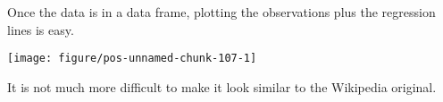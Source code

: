 \documentclass[paper=a4,10pt,div=17,headsepline,BCOR=12mm,twoside,open=right]{scrbook}\usepackage{knitr}
\begin{document}
\begin{knitrout}\footnotesize
{}\color{fgcolor}\begin{kframe}
\begin{alltt}
 \hlkwb{<-} \hlstd{(} \hlstd{=}\hlstd{)}
 \hlkwb{<-} \hlstd{(} \hlstd{= my.mat[ ,} \hlstd{],}
                           \hlstd{= my.mat[ ,} \hlstd{],}
                          \hlstd{=}\hlstd{(}\hlstd{(}\hlopt{:}\hlstd{,} \hlstd{(}\hlstd{,}\hlstd{))))}
\end{alltt}
\end{kframe}
\end{knitrout}

Once the data is in a data frame, plotting the observations plus the regression lines is easy.

\begin{knitrout}\footnotesize
{}\color{fgcolor}\begin{kframe}
\begin{alltt}
  \hlopt{+}
  \hlstd{()} \hlopt{+}
  \hlstd{(}\hlstd{=}\hlstd{)} \hlopt{+}
  \hlstd{(}\hlopt{~} \hlstd{=}\hlstd{)}
\end{alltt}
\end{kframe}

{\centering \texttt{[image: figure/pos-unnamed-chunk-107-1]} 

}



\end{knitrout}

It is not much more difficult to make it look similar to the Wikipedia original.
\end{document}
